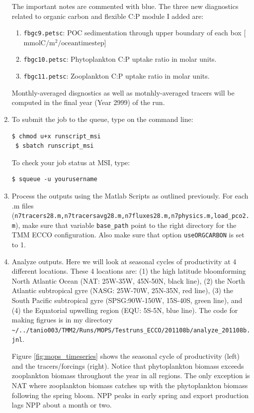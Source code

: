 \documentclass[a4paper]{article}
\def\noin{\noindent }
\begin{document}
\begin{enumerate}
The important notes are commented with blue. The three new diagnostics related to organic carbon and flexible C:P module I added are: 
\begin{enumerate}
\item \verb|fbgc9.petsc|: POC sedimentation through upper boundary of each box [$\mathrm{mmol C/m^2/oceantimestep}$]
\item \verb|fbgc10.petsc|: Phytoplankton C:P uptake ratio in molar units.
\item \verb|fbgc11.petsc|: Zooplankton C:P uptake ratio in molar units.
\end{enumerate}
Monthly-averaged disgnostics as well as motnhly-averaged tracers will be computed in the final year (Year 2999) of the run.

\item To submit the job to the queue, type on the command line:
\begin{lstlisting}[style=DOS]
 $ chmod u+x runscript_msi
 $ sbatch runscript_msi
\end{lstlisting}

\noin To check your job status at MSI, type:
\begin{lstlisting}[style=DOS]
 $ squeue -u yourusername
\end{lstlisting}

\item Process the outputs using the Matlab Scripts as outlined previously. For each .m files \\
(\verb|n7tracers28.m,n7tracersavg28.m,n7fluxes28.m,n7physics.m,load_pco2.m|), 
make sure that variable \verb/base_path/ point to the right directory for the TMM ECCO configuration. Also make sure that option \verb|useORGCARBON| is set to 1.

\item Analyze outputs. Here we will look at seasonal cycles of productivity at 4 different locations. These 4 locations are: (1) the high latitude bloomforming North Atlantic Ocean (NAT: 25W-35W, 45N-50N, black line), (2) the North Atlantic subtropical gyre (NASG: 25W-70W, 25N-35N, red line), (3) the South Pacific subtropical gyre (SPSG:90W-150W, 15S-40S, green line), and (4) the Equatorial upwelling region (EQU: 5S-5N, blue line). The  code for making figrues is in my directory \\ \verb|~/../tanio003/TMM2/Runs/MOPS/Testruns_ECCO/201108b/analyze_201108b.jnl|.

Figure \ref{fig:mops_timeseries} shows the seasonal cycle of productivity (left) and the tracers/forcings (right). Notice that phytoplankton biomass exceeds zooplankton biomass throughout the year in all regions. The only exception is NAT where zooplankton biomass catches up with the phytoplankton biomass following the spring bloom. NPP peaks in early spring and export production lags NPP about a month or two. 


\end{enumerate}
\end{document}
